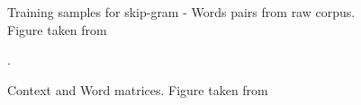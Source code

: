 \documentclass[12pt]{report} %
\begin{document}
\begin{figure}[!tbp]
	\centering
	\caption{Training samples for skip-gram - Words pairs from raw corpus. Figure taken from \cite{jurafsky2014speech}}
	\label{train_sam}
	
\end{figure}


\begin{figure}[h]
	\centering
	\caption{Context and Word matrices. Figure taken from \cite{jurafsky2014speech}}.
	\label{C_W_matrics}	
\end{figure}
\end{document}
